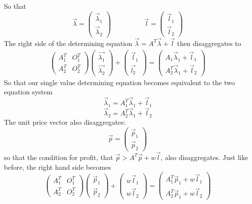 So that 
\[ \vec{\lambda} = \begin{pmatrix} \vec{\lambda}_1 \\ \vec{\lambda}_2 \end{pmatrix}  \hspace{2cm} \vec{l} = \begin{pmatrix} \vec{l}_1 \\ \vec{l}_2 \end{pmatrix} \]
The right side of the determining equation $\vec{\lambda} = A^T\vec{\lambda}+\vec{l}$ then disaggregates to
\begin{align*}
	\begin{pmatrix} A_1^T & O_1^T \\ A_2^T & O^T_2 \end{pmatrix} \begin{pmatrix} \vec{\lambda_1} \\ \vec{\lambda_2} \end{pmatrix} + \begin{pmatrix} \vec{l}_1 \\ \vec{l_2} \end{pmatrix} = \begin{pmatrix} A_1\vec{\lambda}_1 +\vec{l}_1 \\ A_2^T\vec{\lambda}_1 + \vec{l}_2 \end{pmatrix}
\end{align*} 
So that our single value determining equation becomes equivalent to the two equation system
\[ \vec{\lambda}_1 = A^T_1\vec{\lambda}_1+\vec{l}_1 \]
\[ \vec{\lambda}_2 = A^T_2\vec{\lambda}_1+\vec{l}_2 \]
The unit price vector also disaggregates:
\[ \vec{p} = \begin{pmatrix} \vec{p}_1 \\ \vec{p}_2 \end{pmatrix} \]
so that the condition for profit, that $\vec{p} > A^T\vec{p}+w\vec{l}$, also disaggregates. Just like before, the right hand side becomes
\[ \begin{pmatrix} A_1^T & O^T_1 \\ A_2^T & O^T_2  \end{pmatrix} \begin{pmatrix} \vec{p}_1 \\ \vec{p}_2 \end{pmatrix} + \begin{pmatrix} w\vec{l}_1 \\ w\vec{l}_2 \end{pmatrix} = \begin{pmatrix} A_1^T\vec{p}_1 + w\vec{l}_1 \\ A_2^T\vec{p}_1 + w\vec{l}_2 \end{pmatrix} \]
